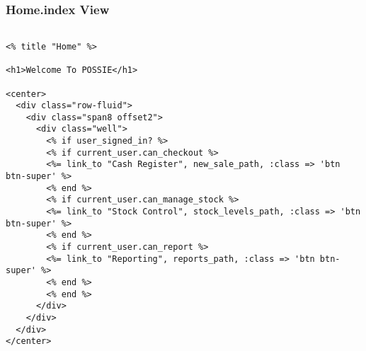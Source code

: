 \documentclass[a4paper]{article}
\begin{document}
\subsubsection{Home.index View}
\begin{verbatim}

<% title "Home" %>

<h1>Welcome To POSSIE</h1>

<center>
  <div class="row-fluid">
    <div class="span8 offset2">
      <div class="well">
        <% if user_signed_in? %>
        <% if current_user.can_checkout %>
        <%= link_to "Cash Register", new_sale_path, :class => 'btn btn-super' %>
        <% end %>
        <% if current_user.can_manage_stock %>
        <%= link_to "Stock Control", stock_levels_path, :class => 'btn btn-super' %>
        <% end %>
        <% if current_user.can_report %>
        <%= link_to "Reporting", reports_path, :class => 'btn btn-super' %>
        <% end %>
        <% end %>
      </div>
    </div>
  </div>
</center>
\end{verbatim}
\end{document}
